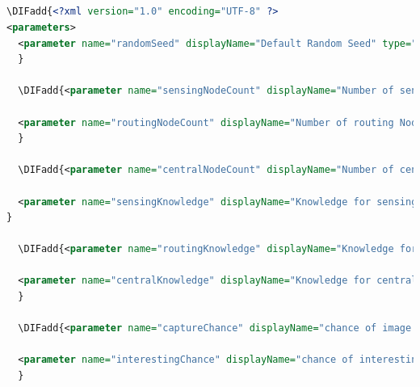 \begin{appendices}
\chapter{}\label{appendix:sims:params}
\begin{lstlisting}[language=XML, caption={Example params.xml file for a Repast simulation}]
\DIFadd{<?xml version="1.0" encoding="UTF-8" ?>
<parameters>
  <parameter name="randomSeed" displayName="Default Random Seed" type="int" defaultValue="__NULL__" />
  }

  \DIFadd{<parameter name="sensingNodeCount" displayName="Number of sensing Nodes" type="int" defaultValue="20" isReadOnly="false" converter="repast.simphony.parameter.StringConverterFactory$IntConverter"  />

  <parameter name="routingNodeCount" displayName="Number of routing Nodes" type="int" defaultValue="4" isReadOnly="false" converter="repast.simphony.parameter.StringConverterFactory$IntConverter" />
  }

  \DIFadd{<parameter name="centralNodeCount" displayName="Number of central Nodes" type="int" defaultValue="1" isReadOnly="false" converter="repast.simphony.parameter.StringConverterFactory$IntConverter" />

  <parameter name="sensingKnowledge" displayName="Knowledge for sensing nodes" type="java.lang.String" defaultValue="MK" isReadOnly="false" converter="repast.simphony.parameter.StringConverterFactory$StringStringConverter"/>
}

  \DIFadd{<parameter name="routingKnowledge" displayName="Knowledge for routing nodes" type="java.lang.String" defaultValue="MK" isReadOnly="false" converter="repast.simphony.parameter.StringConverterFactory$StringStringConverter"/>

  <parameter name="centralKnowledge" displayName="Knowledge for central nodes" type="java.lang.String" defaultValue="NK" isReadOnly="false" converter="repast.simphony.parameter.StringConverterFactory$StringStringConverter"/>
  }

  \DIFadd{<parameter name="captureChance" displayName="chance of image capture" type="double" defaultValue="0.000857703189" isReadOnly="false" converter="repast.simphony.parameter.StringConverterFactory$DoubleConverter"/>

  <parameter name="interestingChance" displayName="chance of interesting capture" type="double" defaultValue="0.207" isReadOnly="false" converter="repast.simphony.parameter.StringConverterFactory$DoubleConverter"/>
  }


\end{lstlisting}
\end{appendices}
